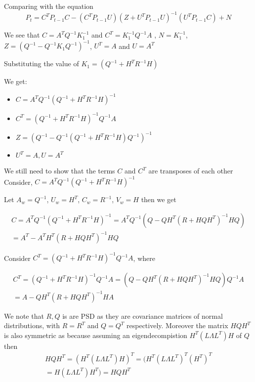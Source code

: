 \documentclass{tufte-handout}
\begin{document}
\begin{enumerate}[(a)]
Comparing with the equation 
    \begin{equation*}
        P_t = C^TP_{t-1}C - (C^T P_{t-1}U)(Z + U^TP_{t-1}U)^{-1}(U^TP_{t-1}C) + N
    \end{equation*}

    We see that $C = A^TQ^{-1}K_1^{-1} $ and  $C^T = K_1^{-1} Q^{-1}A$ , $N = K_1^{-1}$, $Z = (Q^{-1} - Q^{-1}K_1 Q^{-1})^{-1} $, $U^T =A $ and $U = A^T$

    Substituting the value of $K_1=(Q^{-1}  + H^TR^{-1}H) $

    We get: 
    \begin{itemize}
        \item  $C = A^TQ^{-1}(Q^{-1} + H^T R^{-1}H)^{-1}$
        \item  $C^T = (Q^{-1} + H^T R^{-1}H)^{-1}Q^{-1}A$
        \item $Z  = (Q^{-1} - Q^{-1}(Q^{-1}  + H^TR^{-1}H) Q^{-1})^{-1} $
        \item $U^T = A, U = A^T$
    \end{itemize}
\end{enumerate}

We still need to show that the terms $C$ and $C^T$ are transposes 
of each other Consider, $C = A^TQ^{-1}(Q^{-1} + H^T R^{-1}H)^{-1}$

Let $A_w = Q^{-1}$, $U_w = H^T$, $C_w = R^{-1}$, $V_w = H$ then 
we get 

\begin{multline*}
    C  = A^{T}Q^{-1}(Q^{-1} + H^{T}R^{-1} H)^{-1} 
       =  A^T Q^{-1} ( Q - Q H^T (R + HQH^T)^{-1}HQ) \\ 
       =  A^T  - A^T H^T ( R + HQH^T)^{-1}  HQ
\end{multline*}


Consider $C^T = (Q^{-1} + H^T R^{-1}H)^{-1}Q^{-1}A$, where

\begin{multline}
   C^T = (Q^{-1} + H^T R^{-1}H)^{-1}Q^{-1}A  
       = (Q  - Q H^T (R + HQH^T)^{-1} HQ) Q^{-1}A \\ 
       = A - QH^T (R + HQH^T)^{-1} H A
       \label{c-transpose}
\end{multline}

We note that $R, Q$ is are PSD as they are covariance matrices of normal distributions, with $R = R^T$ and  $Q = Q^T$ respectively.  Moreover the matrix 
$H Q H^T$  is also symmetric as because assuming an 
eigendecompistion $H^T ( L \Lambda L ^T ) H$ of $Q$
then 
\begin{multline}
    HQH^T = (H^T (L \Lambda L^T) H)^T =  (H^T (L \Lambda L^T) ^T (H^T)^T \\ 
     = H (L \Lambda L^T) H^T) =   HQH^T
\end{multline}
\end{document}
